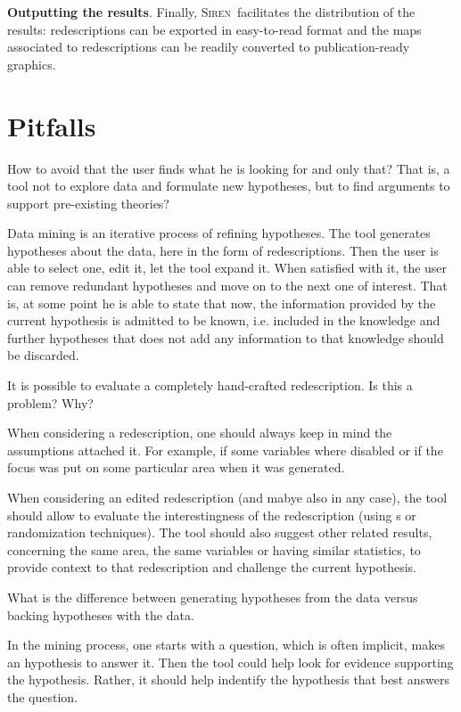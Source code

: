 \documentclass{llncs}
\newcommand{\prg}[1]{\textbf{#1}.}
\renewcommand{\note}[1]{{\color{red}{#1}\par}}
\newcommand{\Siren}{\textsc{Siren}}
\begin{document}
\prg{Outputting the results}
\label{sec:outputting-results}
Finally, \Siren\ facilitates the distribution of the results:
redescriptions can be exported in easy-to-read format and the
maps associated to redescriptions can be readily converted to
publication-ready graphics. 


\section{Pitfalls}
\note{Use this section to open discussion (no conclusion section) ?}
How to avoid that the user finds what he is looking for and only that?
That is, a tool not to explore data and formulate new hypotheses, but to find arguments to support pre-existing theories?

Data mining is an iterative process of refining hypotheses. The tool generates hypotheses about the data, here in the form of redescriptions. Then the user is able to select one, edit it, let the tool expand it. When satisfied with it, the user can remove redundant hypotheses and move on to the next one of interest. That is, at some point he is able to state that now, the information provided by the current hypothesis is admitted to be known, i.e. included in the knowledge and further hypotheses that does not add any information to that knowledge should be discarded.

It is possible to evaluate a completely hand-crafted redescription. Is this a problem? Why?

When considering a redescription, one should always keep in mind the assumptions attached it. For example, if some variables where disabled or if the focus was put on some particular area when it was generated.

When considering an edited redescription (and mabye also in any case), the tool should allow to evaluate the interestingness of the redescription (using \pValue{}s or randomization techniques). The tool should also suggest other related results, concerning the same area, the same variables or having similar statistics, to provide context to that redescription and challenge the current hypothesis.

What is the difference between generating hypotheses from the data versus backing hypotheses with the data.

In the mining process, one starts with a question, which is often implicit, makes an hypothesis to answer it. Then the tool could help look for evidence supporting the hypothesis. Rather, it should help indentify the hypothesis that best answers the question.  


%

  
\end{document}
